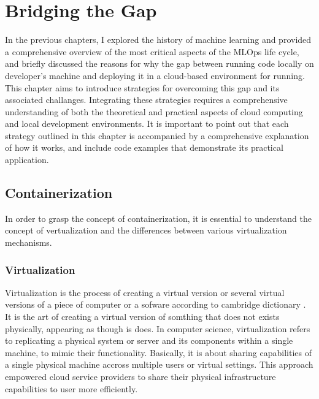 \chapter{Bridging the Gap}\label{chapter:solutions}

In the previous chapters, I explored the history of machine learning and provided a comprehensive overview of the most critical aspects of the \ac{MLOps} life cycle, and briefly discussed the reasons for why the gap between running code locally on developer's machine and deploying it in a cloud-based environment for running.
\newline
This chapter aims to introduce strategies for overcoming this gap and its associated challanges. Integrating these strategies requires a comprehensive understanding of both the theoretical and practical aspects of cloud computing and local development environments. It is important to point out that each strategy outlined in this chapter is accompanied by a comprehensive explanation of how it works, and include code examples that demonstrate its practical application.
\section{Containerization}
In order to grasp the concept of containerization, it is essential to understand the concept of vertualization and the differences between various virtualization mechanisms.

\subsection{Virtualization}
Virtualization is the process of creating a virtual version or several virtual versions of a piece of computer or a sofware according to cambridge dictionary \cite{cambridge_dictionary}. It is the art of creating a virtual version of somthing that does not exists physically, appearing as though is does.
\newline
In computer science, virtualization refers to replicating a physical system or server and its components within a single machine, to mimic their functionality. Basically, it is about sharing capabilities of a single physical machine accross multiple users or virtual settings. This approach empowered cloud service providers to share their physical infrastructure capabilities to user more efficiently.

